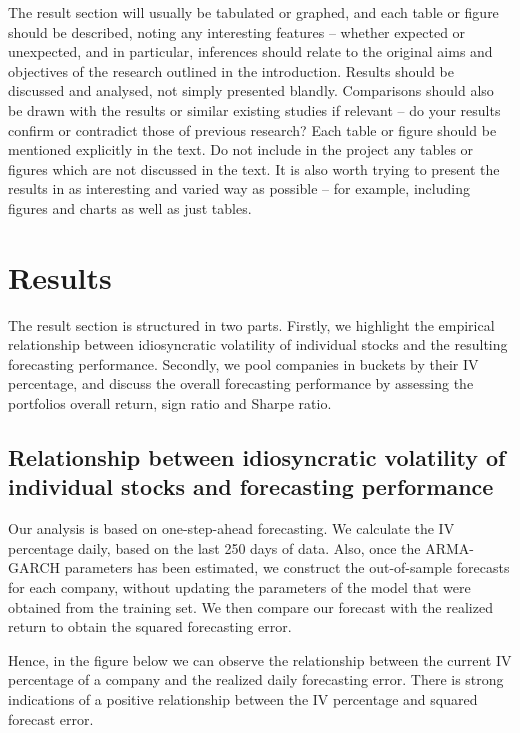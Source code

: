 The result section will usually be tabulated or graphed, and each table or figure should be described, noting any interesting features – whether expected or unexpected, and in particular, inferences should relate to the original aims and objectives of the research outlined in the introduction. Results should be discussed and analysed, not simply presented blandly. Comparisons should also be drawn with the results or similar existing studies if relevant – do your results confirm or contradict those of previous research? Each table or figure should be mentioned explicitly in the text. Do not include in the project any tables or figures which are not discussed in the text. It is also worth trying to present the results in as interesting and varied way as possible – for example, including figures and charts as well as just tables.


\chapter{Results}
The result section is structured in two parts. Firstly, we highlight the empirical relationship between idiosyncratic volatility of individual stocks and the resulting forecasting performance. Secondly, we pool companies in buckets by their IV percentage, and discuss the overall forecasting performance by assessing the portfolios overall return, sign ratio and Sharpe ratio.

\section*{Relationship between idiosyncratic volatility of individual stocks and forecasting performance}

Our analysis is based on one-step-ahead forecasting. We calculate the IV percentage daily, based on the last 250 days of data. Also, once the ARMA-GARCH parameters has been estimated, we construct the out-of-sample forecasts for each company, without updating the parameters of the model that were
obtained from the training set. We then compare our forecast with the realized return to obtain the squared forecasting error. 

Hence, in the figure below we can observe the relationship between the current IV percentage of a company and the realized daily forecasting error. There is strong indications of a positive relationship between the IV percentage and squared forecast error. 


